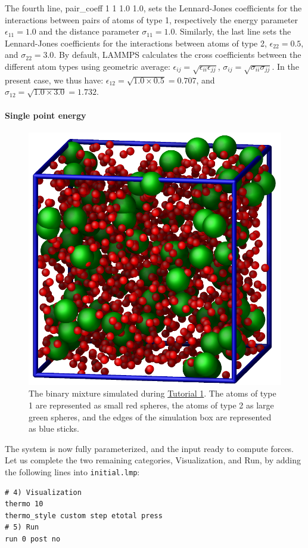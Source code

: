 \documentclass[9pt,tutorial]{livecoms}
\newcommand{\lmpcmd}[1]{\hspace{0pt}\colorbox{listing}{\textcolor{command}{\small{#1}}}\hspace{0pt}} %
\newcommand{\flecmd}[1]{\textcolor{command}{\texttt{#1}}} %
\begin{document}
The fourth line, \lmpcmd{pair\_coeff 1 1 1.0 1.0}, sets the
Lennard-Jones coefficients for the interactions between pairs of atoms
of type 1, respectively the energy parameter $\epsilon_{11} = 1.0$ and
the distance parameter $\sigma_{11} = 1.0$.  Similarly, the last line
sets the Lennard-Jones coefficients for the interactions between atoms
of type 2, $\epsilon_{22} = 0.5$, and $\sigma_{22} = 3.0$.  By default,
LAMMPS calculates the cross coefficients between the different atom
types using geometric average:
$\epsilon_{ij} = \sqrt{\epsilon_{ii} \epsilon_{jj}}$,
$\sigma_{ij} = \sqrt{\sigma_{ii} \sigma_{jj}}$.  In the present case, we
thus have: $\epsilon_{12} = \sqrt{1.0 \times 0.5} = 0.707$, and
$\sigma_{12} = \sqrt{1.0 \times 3.0} = 1.732$.

\paragraph{Single point energy}

\begin{figure}
\centering
\includegraphics[width=0.55\linewidth]{LJ}
\caption{The binary mixture simulated during \hyperref[lennard-jones-label]{Tutorial 1}.
  The atoms of type 1 are represented as small red spheres, the atoms of type 2 as large
  green spheres, and the edges of the simulation box are represented as blue sticks.}
\label{fig:LJ}
\end{figure}

The system is now fully parameterized, and the input ready to compute
forces.  Let us complete the two remaining categories,
\lmpcmd{Visualization}, and \lmpcmd{Run}, by adding the following lines
into \flecmd{initial.lmp}:
\begin{lstlisting}
# 4) Visualization
thermo 10
thermo_style custom step etotal press
# 5) Run
run 0 post no
\end{lstlisting}
\end{document}
